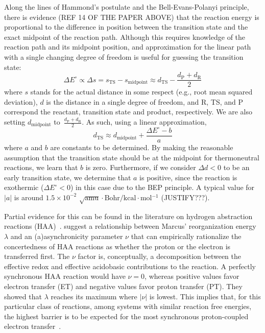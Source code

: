Along the lines of Hammond's postulate and the Bell-Evans-Polanyi principle,
there is evidence (REF 14 OF THE PAPER ABOVE) that the reaction energy is
proportional to the difference in position between the transition state and the
exact midpoint of the reaction path.
Although this requires knowledge of the reaction path and its midpoint
position, and approximation for the linear path with a single changing degree
of freedom is useful for guessing the transition state:
%
\begin{equation}
    \Delta E^\circ \propto \Delta s
        = s_\text{TS} - s_\text{midpoint}
        \approx d_\text{TS} - \frac{d_\text{P} + d_\text{R}}{2}
\end{equation}
%
where $s$ stands for the actual distance in some respect (e.g., root mean
squared deviation), $d$ is the distance in a single degree of freedom, and R,
TS, and P correspond the reactant, transition state and product, respectively.
We are also setting $d_\text{midpoint}$
to~$\frac{d_\text{P} + d_\text{R}}{2}$.
As such, using a linear approximation,
%
\begin{equation}
    d_\text{TS}
    \approx d_\text{midpoint} + \frac{\Delta E^\circ - b}{a}
\end{equation}
%
where $a$ and $b$ are constants to be determined.
By making the reasonable assumption that the transition state should be at the
midpoint for thermoneutral reactions, we learn that $b$ is zero.
Furthermore, if we consider $\Delta d < 0$ to be an early transition state, we
determine that $a$ is positive, since the reaction is exothermic
($\Delta E^\circ < 0$) in this case due to the BEP principle.
A typical value for $|a|$ is around
$1.5 \times 10^{-2}$
$\sqrt{\text{amu}}\cdot\text{Bohr} / \text{kcal$\cdot$mol$^{-1}$}$
(JUSTIFY???).

Partial evidence for this can be found in the literature on hydrogen
abstraction reactions (HAA)~\cite{Bim2018}.
\citeauthor{Bim2018} suggest a relationship between Marcus' reorganization
energy $\lambda$ and an (a)asynchronicity parameter $\nu$ that can empirically
rationalize the concertedness of HAA reactions as whether the proton or the
electron is transferred first.
The $\nu$ factor is, conceptually, a decomposition between the effective redox
and effective acidobasic contributions to the reaction.
A perfectly synchronous HAA reaction would have $\nu = 0$, whereas positive
values favor electron transfer (ET) and negative values favor proton transfer
(PT).
They showed that $\lambda$ reaches its maximum where $|\nu|$ is lowest.
This implies that, for this particular class of reactions, among systems with
similar reaction free energies, the highest barrier is to be expected for the
most synchronous proton-coupled electron transfer~\cite{Bim2018}.
